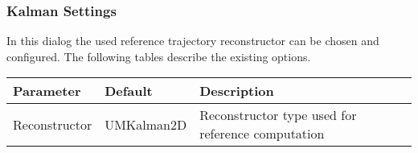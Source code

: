 
\subsubsection*{Kalman Settings}


In this dialog the used reference trajectory reconstructor can be chosen and configured.
The following tables describe the existing options.

\begin{table}[H]
    \center
    \begin{tabularx}{\textwidth}{ | l | l | X |}
        \hline
        \textbf{Parameter} & \textbf{Default} & \textbf{Description} \\ \hline
        Reconstructor & UMKalman2D & Reconstructor type used for reference computation \\ \hline
    \end{tabularx}
\end{table}


